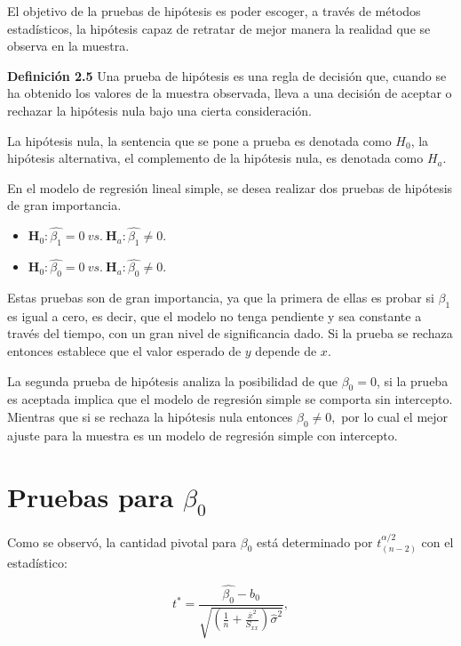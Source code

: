 \documentclass[
  a4paper,
  oneside,
  openany]{book}
\begin{document}
El objetivo de la pruebas de hipótesis es poder escoger, a través de métodos estadísticos, la hipótesis capaz de retratar de mejor manera la realidad que se observa en la muestra.

\textbf{Definición 2.5} Una prueba de hipótesis es una regla de decisión que, cuando se ha obtenido los valores de la muestra observada, lleva a una decisión de aceptar o rechazar la hipótesis nula bajo una cierta consideración.

La hipótesis nula, la sentencia que se pone a prueba es denotada como \(H_0\), la hipótesis alternativa, el complemento de la hipótesis nula, es denotada como \(H_a.\)

En el modelo de regresión lineal simple, se desea realizar dos pruebas de hipótesis de gran importancia.

\begin{itemize}
\item
  \(\textbf{H}_0: \hat{\beta_{1}}=0 \ vs. \  \textbf{H}_a:\hat{\beta_{1}} \neq 0.\)
\item
  \(\textbf{H}_0: \hat{\beta_{0}}=0 \ vs. \  \textbf{H}_a:\hat{\beta_{0}} \neq 0.\)
\end{itemize}

Estas pruebas son de gran importancia, ya que la primera de ellas es probar si \(\beta_{1}\) es igual a cero, es decir, que el modelo no tenga pendiente y sea constante a través del tiempo, con un gran nivel de significancia dado. Si la prueba se rechaza entonces establece que el valor esperado de \(y\) depende de \(x\).

La segunda prueba de hipótesis analiza la posibilidad de que \(\beta_{0}=0\), si la prueba es aceptada implica que el modelo de regresión simple se comporta sin intercepto. Mientras que si se rechaza la hipótesis nula entonces \(\beta_{0}\neq 0,\) por lo cual el mejor ajuste para la muestra es un modelo de regresión simple con intercepto.

\hypertarget{pruebas-para-beta_0}{%
\section{\texorpdfstring{Pruebas para \(\beta_{0}\)}{Pruebas para \textbackslash beta\_\{0\}}}\label{pruebas-para-beta_0}}

Como se observó, la cantidad pivotal para \(\beta_{0}\) está determinado por \(t^{\alpha/2}_{(n-2)}\) con el estadístico:

\[t^*=\frac{\hat{\beta_{0}}-b_{0}}{\sqrt{\left(\frac{1}{n}+\frac{\overline{x}^2}{S_{xx}}\right)\hat{\sigma}^2}},\]
\end{document}
